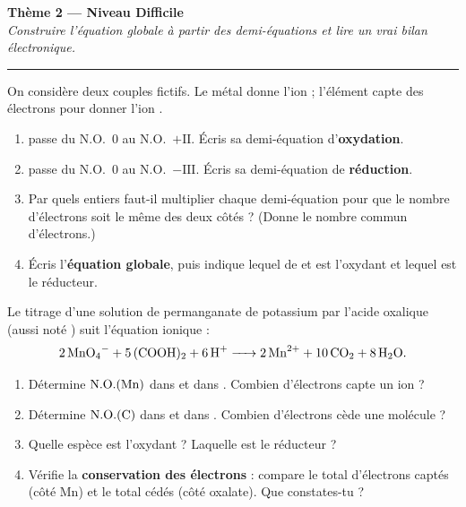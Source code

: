\documentclass[11pt,a4paper]{article}
\newcommand{\NO}{\ensuremath{\mathrm{N.O.}}}
\newcounter{exo}
\begin{document}
\begin{center}
{\LARGE\bfseries\color{primarydark}Thème 2 — Niveau Difficile}\\[2pt]
{\small\itshape Construire l'équation globale à partir des demi-équations et lire un vrai bilan électronique.}\\[-4pt]
{\color{primary}\rule{\textwidth}{1pt}}
\end{center}

\begin{exo}
On considère deux couples fictifs. Le métal  donne l'ion  ; l'élément 
capte des électrons pour donner l'ion .
\begin{enumerate}[label=\textbf{\alph*)},leftmargin=2.2em,topsep=2pt,itemsep=2pt]
  \item {} passe du \NO\ $0$ au \NO\ $+\mathrm{II}$. Écris sa demi-équation d'\textbf{oxydation}.
  \item {} passe du \NO\ $0$ au \NO\ $-\mathrm{III}$. Écris sa demi-équation de \textbf{réduction}.
  \item Par quels entiers faut-il multiplier chaque demi-équation pour que le nombre d'électrons
        soit le même des deux côtés ? (Donne le nombre commun d'électrons.)
  \item Écris l'\textbf{équation globale}, puis indique lequel de  et  est l'oxydant et
        lequel est le réducteur.
\end{enumerate}
\end{exo}

\begin{exo}
Le titrage d'une solution de permanganate de potassium par l'acide oxalique 
(aussi noté ) suit l'équation ionique :
\[
\ce{2 MnO4^- + 5 (COOH)2 + 6 H+ -> 2 Mn^{2+} + 10 CO2 + 8 H2O}.
\]
\begin{enumerate}[label=\textbf{\alph*)},leftmargin=2.2em,topsep=2pt,itemsep=2pt]
  \item Détermine $\NO(\ce{Mn})$ dans  et dans . Combien d'électrons capte un ion  ?
  \item Détermine $\NO(\ce{C})$ dans  et dans . Combien d'électrons cède une molécule  ?
  \item Quelle espèce est l'oxydant ? Laquelle est le réducteur ?
  \item Vérifie la \textbf{conservation des électrons} : compare le total d'électrons captés (côté Mn)
        et le total cédés (côté oxalate). Que constates-tu ?
\end{enumerate}
\end{exo}
\end{document}
